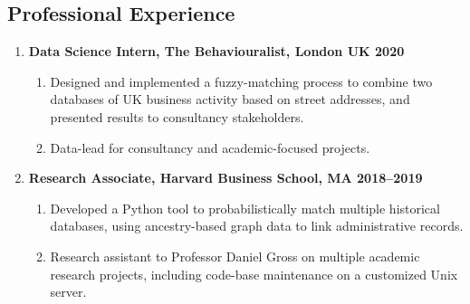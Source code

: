 \documentclass[letterpaper,11pt,oneside]{article}
\begin{document}
\subsection*{Professional Experience}
\begin{enumerate}[itemsep=2.5pt, label={}, leftmargin=0pt]
    \item \textbf{Data Science Intern, The Behaviouralist, London UK \hfill 2020}
    \begin{enumerate}[itemsep=0pt, label={\textbf{--}}, leftmargin=12pt]
        \item Designed and implemented a fuzzy-matching process to combine two databases of UK business activity based on street addresses, and presented results to consultancy stakeholders.
        \item Data-lead for consultancy and academic-focused projects.
    \end{enumerate}
    
    \item \textbf{Research Associate, Harvard Business School, MA \hfill 2018--2019}
    \begin{enumerate}[itemsep=0pt, label={\textbf{--}}, leftmargin=12pt]
        \item Developed a Python tool to probabilistically match multiple historical databases, using ancestry-based graph data to link administrative records.
        \item Research assistant to Professor Daniel Gross on multiple academic research projects, including code-base maintenance on a customized Unix server.
    \end{enumerate}
\end{enumerate}
    
\end{document}
